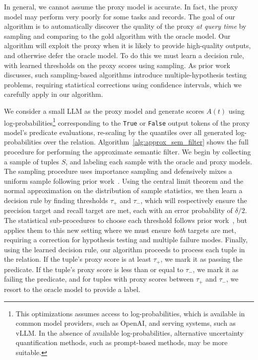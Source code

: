 In general, we cannot assume the proxy model is accurate. In fact, the proxy model may perform very poorly for some tasks and records. The goal of our algorithm is to automatically discover the quality of the proxy \emph{at query time} by sampling and comparing to the gold algorithm with the oracle model. Our algorithm will exploit the proxy when it is likely to provide high-quality outputs, and otherwise defer the oracle model. To do this we must learn a decision rule, with learned thresholds on the proxy scores using sampling. As prior work~\cite{kang_approximate_2020} discusses, such sampling-based algorithms introduce multiple-hypothesis testing problems, requiring statistical corrections using confidence intervals, which we carefully apply in our algorithm.

We consider a small LLM as the proxy model and generate scores $A(t)$ using log-probabilities\footnote{This optimizations assumes access to log-probabilities, which is available in common model providers, such as OpenAI, and serving systems, such as vLLM. In the absence of available log-probabilities, alternative uncertainty quantification methods, such as prompt-based methods, may be more suitable.} corresponding to the \verb|True| or \verb|False| output tokens of the proxy model's predicate evaluations, re-scaling by the quantiles over all generated log-probabilities over the relation. 
Algorithm~\ref{alg:approx_sem_filter} shows the full procedure for performing the approximate semantic filter. We begin by collecting a sample of tuples $S$, and labeling each sample with the oracle and proxy models. The sampling procedure uses importance sampling and defensively mixes a uniform sample following prior work~\cite{kang_approximate_2022}. Using the central limit theorem and the normal approximation on the distribution of sample statistics, we then learn a decision rule by finding thresholds $\tau_+$ and $\tau_-$, which will respectively ensure the precision target and recall target are met, each with an error probability of $\delta/2$. The statistical sub-procedures to choose each threshold follows prior work~\cite{kang_approximate_2022}, but applies them to this new setting where we must ensure \emph{both} targets are met, requiring a correction for hypothesis testing and multiple failure modes. 
Finally, using the learned decision rule, our algorithm proceeds to process each tuple in the relation. If the tuple's proxy score is at least $\tau_+$, we mark it as passing the predicate. If the tuple's proxy score is less than or equal to $\tau_-$, we mark it as failing the predicate, and for tuples with proxy scores between $\tau_+$ and $\tau_-$, we resort to the oracle model to provide a label.


